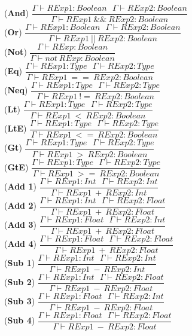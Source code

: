 \documentclass[12pt]{article}
\begin{document}
\begin{center}
\noindent(\textbf{And})
$\dfrac{\Gamma \vdash RExp1:Boolean\ \ \ \Gamma \vdash RExp2:Boolean}{\Gamma \vdash RExp1\ \&\&\ RExp2:Boolean}$\\[0.1in]
\noindent(\textbf{Or})
$\dfrac{\Gamma \vdash RExp1:Boolean\ \ \ \Gamma \vdash RExp2:Boolean}{\Gamma \vdash RExp1\ ||\ RExp2:Boolean}$\\[0.1in]
\noindent(\textbf{Not})
$\dfrac{\Gamma \vdash RExp:Boolean}{\Gamma \vdash not\  RExp:Boolean}$\\[0.1in]

\noindent(\textbf{Eq})
$\dfrac{\Gamma \vdash RExp1:Type\ \ \ \Gamma \vdash RExp2:Type}{\Gamma \vdash RExp1\ ==\ RExp2:Boolean}$\\[0.1in]
\noindent(\textbf{Neq})
$\dfrac{\Gamma \vdash RExp1:Type\ \ \ \Gamma \vdash RExp2:Type}{\Gamma \vdash RExp1\ !=\ RExp2:Boolean}$\\[0.1in]
\noindent(\textbf{Lt})
$\dfrac{\Gamma \vdash RExp1:Type\ \ \ \Gamma \vdash RExp2:Type}{\Gamma \vdash RExp1\ <\ RExp2:Boolean}$\\[0.1in]
\noindent(\textbf{LtE})
$\dfrac{\Gamma \vdash RExp1:Type\ \ \ \Gamma \vdash RExp2:Type}{\Gamma \vdash RExp1\ <=\ RExp2:Boolean}$\\[0.1in]
\noindent(\textbf{Gt})
$\dfrac{\Gamma \vdash RExp1:Type\ \ \ \Gamma \vdash RExp2:Type}{\Gamma \vdash RExp1\ >\ RExp2:Boolean}$\\[0.1in]
\noindent(\textbf{GtE})
$\dfrac{\Gamma \vdash RExp1:Type\ \ \ \Gamma \vdash RExp2:Type}{\Gamma \vdash RExp1\ >=\ RExp2:Boolean}$\\[0.1in]

\noindent(\textbf{Add 1})
$\dfrac{\Gamma \vdash RExp1:Int\ \ \ \Gamma \vdash RExp2:Int}{\Gamma \vdash RExp1\ +\ RExp2:Int}$\\[0.1in]
\noindent(\textbf{Add 2})
$\dfrac{\Gamma \vdash RExp1:Int\ \ \ \Gamma \vdash RExp2:Float}{\Gamma \vdash RExp1\ +\ RExp2:Float}$\\[0.1in]
\noindent(\textbf{Add 3})
$\dfrac{\Gamma \vdash RExp1:Float\ \ \ \Gamma \vdash RExp2:Int}{\Gamma \vdash RExp1\ +\ RExp2:Float}$\\[0.1in]
\noindent(\textbf{Add 4})
$\dfrac{\Gamma \vdash RExp1:Float\ \ \ \Gamma \vdash RExp2:Float}{\Gamma \vdash RExp1\ +\ RExp2:Float}$\\[0.1in]

\noindent(\textbf{Sub 1})
$\dfrac{\Gamma \vdash RExp1:Int\ \ \ \Gamma \vdash RExp2:Int}{\Gamma \vdash RExp1\ -\ RExp2:Int}$\\[0.1in]
\noindent(\textbf{Sub 2})
$\dfrac{\Gamma \vdash RExp1:Int\ \ \ \Gamma \vdash RExp2:Float}{\Gamma \vdash RExp1\ -\ RExp2:Float}$\\[0.1in]
\noindent(\textbf{Sub 3})
$\dfrac{\Gamma \vdash RExp1:Float\ \ \ \Gamma \vdash RExp2:Int}{\Gamma \vdash RExp1\ -\ RExp2:Float}$\\[0.1in]
\noindent(\textbf{Sub 4})
$\dfrac{\Gamma \vdash RExp1:Float\ \ \ \Gamma \vdash RExp2:Float}{\Gamma \vdash RExp1\ -\ RExp2:Float}$\\[0.1in]


\end{center}
\end{document}
